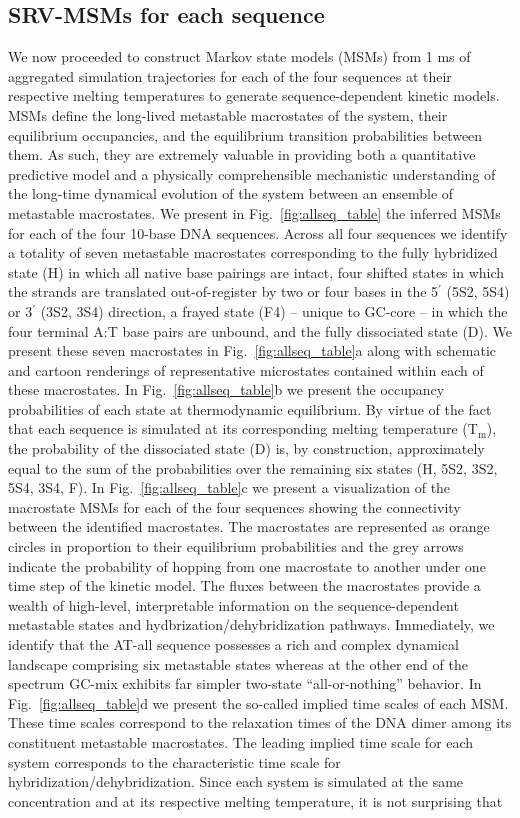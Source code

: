 \documentclass[journal=jpcbfk,manuscript=article]{achemso}
\begin{document}
\subsection{SRV-MSMs for each sequence}

We now proceeded to construct Markov state models (MSMs) from 1 ms of aggregated simulation trajectories for each of the four sequences at their respective melting temperatures to generate sequence-dependent kinetic models. MSMs define the long-lived metastable macrostates of the system, their equilibrium occupancies, and the equilibrium transition probabilities between them. As such, they are extremely valuable in providing both a quantitative predictive model and a physically comprehensible mechanistic understanding of the long-time dynamical evolution of the system between an ensemble of metastable macrostates. We present in Fig.~\ref{fig:allseq_table} the inferred MSMs for each of the four 10-base DNA sequences. Across all four sequences we identify a totality of seven metastable macrostates corresponding to the fully hybridized state (H) in which all native base pairings are intact, four shifted states in which the strands are translated out-of-register by two or four bases in the 5$^\prime$ (5S2, 5S4) or 3$^\prime$ (3S2, 3S4) direction, a frayed state (F4) -- unique to GC-core -- in which the four terminal A:T base pairs are unbound, and the fully dissociated state (D). We present these seven macrostates in Fig.~\ref{fig:allseq_table}a along with schematic and cartoon renderings of representative microstates contained within each of these macrostates. In Fig.~\ref{fig:allseq_table}b we present the occupancy probabilities of each state at thermodynamic equilibrium. By virtue of the fact that each sequence is simulated at its corresponding melting temperature (T$_\mathrm{m}$), the probability of the dissociated state (D) is, by construction, approximately equal to the sum of the probabilities over the remaining six states (H, 5S2, 3S2, 5S4, 3S4, F). In Fig.~\ref{fig:allseq_table}c we present a visualization of the macrostate MSMs for each of the four sequences showing the connectivity between the identified macrostates. The macrostates are represented as orange circles in proportion to their equilibrium probabilities and the grey arrows indicate the probability of hopping from one macrostate to another under one time step of the kinetic model. The fluxes between the macrostates provide a wealth of high-level, interpretable information on the sequence-dependent metastable states and hydbrization/dehybridization pathways. Immediately, we identify that the AT-all sequence possesses a rich and complex dynamical landscape comprising six metastable states whereas at the other end of the spectrum GC-mix exhibits far simpler two-state ``all-or-nothing'' behavior. In Fig.~\ref{fig:allseq_table}d we present the so-called implied time scales of each MSM. These time scales correspond to the relaxation times of the DNA dimer among its constituent metastable macrostates. The leading implied time scale for each system corresponds to the characteristic time scale for hybridization/dehybridization. Since each system is simulated at the same concentration and at its respective melting temperature, it is not surprising that 
\end{document}
